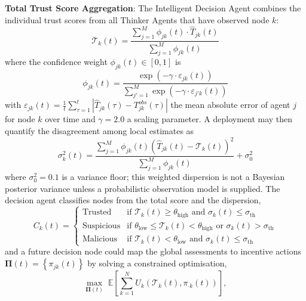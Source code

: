 \documentclass[notspecified,article,submit,moreauthors]{Definitions/mdpi}
\begin{document}
\textbf{Total Trust Score Aggregation}: The Intelligent Decision Agent combines the individual trust scores from all Thinker Agents that have observed node $k$:
\begin{equation}\label{eq:ida_global}
\mathcal{T}_k(t) = \frac{\sum_{j=1}^{M} \phi_{jk}(t) \cdot \hat{T}_{jk}(t)}{\sum_{j=1}^{M} \phi_{jk}(t)}
\end{equation}
where the confidence weight $\phi_{jk}(t) \in [0, 1]$ is
\begin{equation}\label{eq:ida_weight}
\phi_{jk}(t) = \frac{\exp\left(-\gamma \cdot \varepsilon_{jk}(t)\right)}{\sum_{j'=1}^{M} \exp\left(-\gamma \cdot \varepsilon_{j'k}(t)\right)}
\end{equation}
with $\varepsilon_{jk}(t) = \frac{1}{t} \sum_{\tau=1}^{t} \left| \hat{T}_{jk}(\tau) - T_{jk}^{obs}(\tau) \right|$ the mean absolute error of agent $j$ for node $k$ over time and $\gamma = 2.0$ a scaling parameter. A deployment may then quantify the disagreement among local estimates as
\begin{equation}\label{eq:ida_uncertainty}
\sigma_k^2(t) = \frac{\sum_{j=1}^{M} \phi_{jk}(t) \left( \hat{T}_{jk}(t) - \mathcal{T}_k(t) \right)^2}{\sum_{j=1}^{M} \phi_{jk}(t)} + \sigma_0^2
\end{equation}
where $\sigma_0^2 = 0.1$ is a variance floor; this weighted dispersion is not a Bayesian posterior variance unless a probabilistic observation model is supplied. The decision agent classifies nodes from the total score and the dispersion,
\begin{equation}\label{eq:ida_classification}
C_k(t) =
\begin{cases}
\text{Trusted} & \text{if } \mathcal{T}_k(t) \geq \theta_{\text{high}} \text{ and } \sigma_k(t) \leq \sigma_{\text{th}} \\
\text{Suspicious} & \text{if } \theta_{\text{low}} \leq \mathcal{T}_k(t) < \theta_{\text{high}} \text{ or } \sigma_k(t) > \sigma_{\text{th}} \\
\text{Malicious} & \text{if } \mathcal{T}_k(t) < \theta_{\text{low}} \text{ and } \sigma_k(t) \leq \sigma_{\text{th}}
\end{cases}
\end{equation}
and a future decision node could map the global assessments to incentive actions $\boldsymbol{\Pi}(t) = \left\{ \pi_{jk}(t) \right\}$ by solving a constrained optimisation,
\begin{equation}\label{eq:incentive_opt}
\max_{\boldsymbol{\Pi}(t)}\; \mathbb{E}\left[ \sum_{k=1}^{N} U_k\!\left( \mathcal{T}_k(t), \pi_{\cdot k}(t) \right) \right],
\end{equation}
\end{document}
